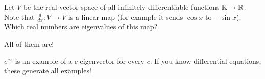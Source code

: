 \begin{problem}
	Let $V$ be the real vector space of all
	infinitely differentiable functions $\mathbb R \to \mathbb R$.
	Note that $\frac{d}{dx} \colon V \to V$ is a linear map
	(for example it sends $\cos x$ to $-\sin x$).
	Which real numbers are eigenvalues of this map?
	\begin{hint}
		All of them are!
	\end{hint}
	\begin{sol}
		$e^{cx}$ is an example of a $c$-eigenvector for every $c$.
		If you know differential equations,
		these generate all examples!
	\end{sol}
\end{problem}
